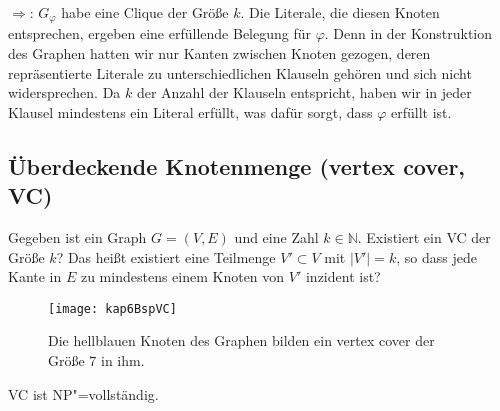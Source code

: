 \begin{Bew}
  \glq$\Rightarrow$\grq: $G_{\varphi}$ habe eine Clique der Größe $k$. Die Literale, die diesen Knoten entsprechen, ergeben eine erfüllende Belegung für $\varphi$. Denn in der Konstruktion des Graphen hatten wir nur Kanten zwischen Knoten gezogen, deren repräsentierte Literale zu unterschiedlichen Klauseln gehören und sich nicht widersprechen. Da $k$ der Anzahl der Klauseln entspricht, haben wir in jeder Klausel mindestens ein Literal erfüllt, was dafür sorgt, dass $\varphi$ erfüllt ist.
\end{Bew}

\subsection{Überdeckende Knotenmenge (vertex cover, VC)}
Gegeben ist ein Graph $G=(V,E)$ und eine Zahl $k \in \mathbb{N}$. Existiert ein \textsc{VC} der Größe $k$? Das heißt existiert eine Teilmenge $V' \subset V$ mit $|V'|=k$, so dass jede Kante in $E$ zu mindestens einem Knoten von $V'$ inzident ist?

\begin{figure}[htb]
  \centering
  \texttt{[image: kap6BspVC]}
  \caption{Die hellblauen Knoten des Graphen bilden ein vertex cover der Größe $7$ in ihm.}
  \label{kap6BspVC}
\end{figure}

\begin{Satz}
  \hspace{\parindent}\textsc{VC} ist \textsf{NP}"=vollständig.
\end{Satz}

